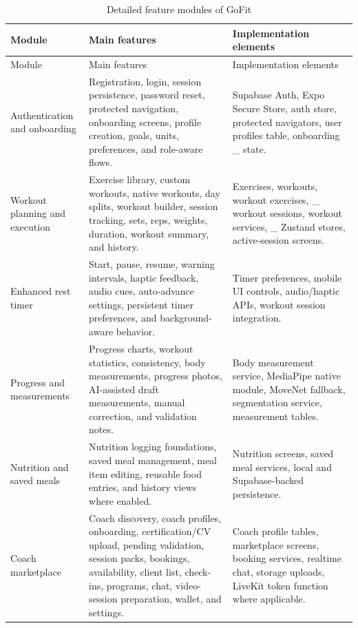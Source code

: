 \documentclass[12pt,a4paper,openany]{report}
\begin{document}
\begingroup
\footnotesize
\setlength{\tabcolsep}{3pt}
\renewcommand{\arraystretch}{1.20}
\setlength{\LTpre}{5pt}
\setlength{\LTpost}{10pt}
\begin{longtable}{|L{3.67cm}|L{5.29cm}|L{5.73cm}|}
\caption{Detailed feature modules of GoFit}\label{tab:pdf-19-11} \\
\hline
{}
Module & Main features & Implementation elements \\ \hline
\endfirsthead
\hline
{}
Module & Main features & Implementation elements \\ \hline
\endhead
Authentication and onboarding & Registration, login, session persistence, password reset, protected navigation, onboarding screens, profile creation, goals, units, preferences, and role-aware flows. & Supabase Auth, Expo Secure Store, auth store, protected navigators, user profiles table, onboarding \_ state. \\ \hline
Workout planning and execution & Exercise library, custom workouts, native workouts, day splits, workout builder, session tracking, sets, reps, weights, duration, workout summary, and history. & Exercises, workouts, workout exercises, \_ workout sessions, workout services, \_ Zustand stores, active-session screens. \\ \hline
Enhanced rest timer & Start, pause, resume, warning intervals, haptic feedback, audio cues, auto-advance settings, persistent timer preferences, and background-aware behavior. & Timer preferences, mobile UI controls, audio/haptic APIs, workout session integration. \\ \hline
Progress and measurements & Progress charts, workout statistics, consistency, body measurements, progress photos, AI-assisted draft measurements, manual correction, and validation notes. & Body measurement service, MediaPipe native module, MoveNet fallback, segmentation service, measurement tables. \\ \hline
Nutrition and saved meals & Nutrition logging foundations, saved meal management, meal item editing, reusable food entries, and history views where enabled. & Nutrition screens, saved meal services, local and Supabase-backed persistence. \\ \hline
Coach marketplace & Coach discovery, coach profiles, onboarding, certification/CV upload, pending validation, session packs, bookings, availability, client list, check-ins, programs, chat, video-session preparation, wallet, and settings. & Coach profile tables, marketplace screens, booking services, realtime chat, storage uploads, LiveKit token function where applicable. \\ \hline

\end{longtable}
\end{document}
